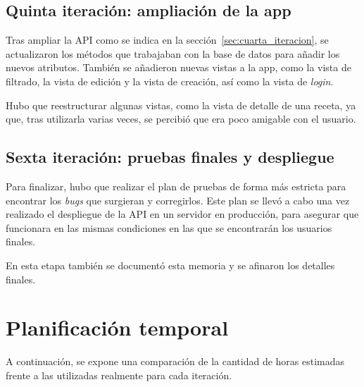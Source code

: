 \subsection{Quinta iteración: ampliación de la app}
\label{sec:quinta_iteracion}

Tras ampliar la API como se indica en la sección~\ref{sec:cuarta_iteracion},
se actualizaron los métodos que trabajaban con la base de datos para añadir
los nuevos atributos. También se añadieron nuevas vistas a la app, como la vista
de filtrado, la vista de edición y la vista de creación, así como la vista de
\textit{login}.

Hubo que reestructurar algunas vistas, como la vista de detalle de una receta,
ya que, tras utilizarla varias veces, se percibió que era poco amigable con el
usuario.

\subsection{Sexta iteración: pruebas finales y despliegue}
\label{sec:sexta_iteracion}

Para finalizar, hubo que realizar el plan de pruebas de forma más estricta para
encontrar los \textit{bugs} que surgieran y corregirlos. Este plan se llevó a
cabo una vez realizado el despliegue de la API en un servidor en producción, para
asegurar que funcionara en las mismas condiciones en las que se encontrarán los
usuarios finales.

En esta etapa también se documentó esta memoria y se afinaron los detalles
finales.


\section{Planificación temporal}
\label{sec:planificacion}

A continuación, se expone una comparación de la cantidad de horas estimadas
frente a las utilizadas realmente para cada iteración.

